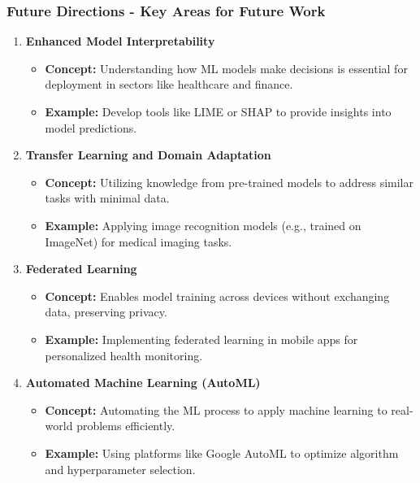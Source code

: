 \documentclass[aspectratio=169]{beamer}
\begin{document}
\begin{frame}[fragile]
    \frametitle{Future Directions - Key Areas for Future Work}
    \begin{enumerate}
        \item \textbf{Enhanced Model Interpretability}
        \begin{itemize}
            \item \textbf{Concept:} Understanding how ML models make decisions is essential for deployment in sectors like healthcare and finance.
            \item \textbf{Example:} Develop tools like LIME or SHAP to provide insights into model predictions.
        \end{itemize}
        
        \item \textbf{Transfer Learning and Domain Adaptation}
        \begin{itemize}
            \item \textbf{Concept:} Utilizing knowledge from pre-trained models to address similar tasks with minimal data.
            \item \textbf{Example:} Applying image recognition models (e.g., trained on ImageNet) for medical imaging tasks.
        \end{itemize}

        \item \textbf{Federated Learning}
        \begin{itemize}
            \item \textbf{Concept:} Enables model training across devices without exchanging data, preserving privacy.
            \item \textbf{Example:} Implementing federated learning in mobile apps for personalized health monitoring.
        \end{itemize}

        \item \textbf{Automated Machine Learning (AutoML)}
        \begin{itemize}
            \item \textbf{Concept:} Automating the ML process to apply machine learning to real-world problems efficiently.
            \item \textbf{Example:} Using platforms like Google AutoML to optimize algorithm and hyperparameter selection.
        \end{itemize}
    \end{enumerate}
\end{frame}
\end{document}
